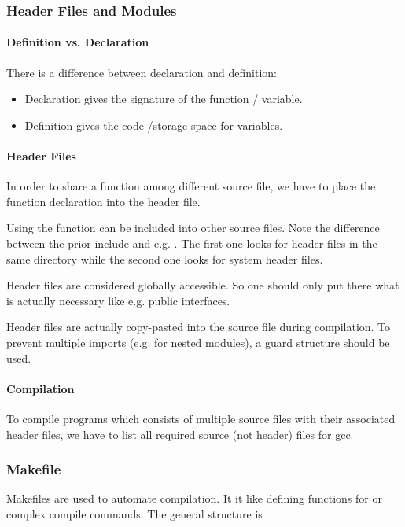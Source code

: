 

\subsubsection{Header Files and Modules}

\paragraph{Definition vs. Declaration}
There is a difference between declaration and definition:
\begin{itemize}
    \item Declaration gives the signature of the function / variable.
    \item Definition gives the code /storage space for variables.
\end{itemize}

\paragraph{Header Files}
In order to share a function among different source file, we have to place the function declaration into the header file.

Using  the function can be included into other source files. Note the difference between the prior include and e.g. . The first one looks for header files in the same directory while the second one looks for system header files.

Header files are considered globally accessible. So one should only put there what is actually necessary like e.g. public interfaces.

Header files are actually copy-pasted into the source file during compilation. To prevent multiple imports (e.g. for nested modules), a guard structure should be used.

\paragraph{Compilation}
To compile programs which consists of multiple source files with their associated header files, we have to list all required source (not header) files for gcc.

\subsubsection{Makefile}
Makefiles are used to automate compilation. It it like defining functions for or complex compile commands. The general structure is

